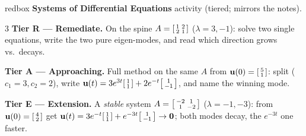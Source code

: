 \documentclass[10pt]{article}
\newcommand{\uu}{\mathbf{u}}
\newcommand{\zero}{\mathbf{0}}
\begin{document}
\begin{skillbox}{redbox}
\textbf{Systems of Differential Equations} activity (tiered; mirrors the notes).
\begin{multicols}{3}
\textbf{Tier R --- Remediate.} On the spine $A=\begin{bsmallmatrix}1&2\\2&1\end{bsmallmatrix}$ ($\lambda=3,-1$):
solve two single equations, write the two pure eigen-modes, and read which direction grows vs.\ decays.

\columnbreak
\textbf{Tier A --- Approaching.} Full method on the same $A$ from $\uu(0)=\begin{bsmallmatrix}5\\1\end{bsmallmatrix}$:
split ($c_1=3,c_2=2$), write $\uu(t)=3e^{3t}\begin{bsmallmatrix}1\\1\end{bsmallmatrix}+2e^{-t}\begin{bsmallmatrix}1\\-1\end{bsmallmatrix}$, and name the winning mode.

\columnbreak
\textbf{Tier E --- Extension.} A \emph{stable} system $A=\begin{bsmallmatrix}-2&1\\1&-2\end{bsmallmatrix}$
($\lambda=-1,-3$): from $\uu(0)=\begin{bsmallmatrix}4\\2\end{bsmallmatrix}$ get
$\uu(t)=3e^{-t}\begin{bsmallmatrix}1\\1\end{bsmallmatrix}+e^{-3t}\begin{bsmallmatrix}1\\-1\end{bsmallmatrix}\to\zero$; both modes decay, the $e^{-3t}$ one faster.
\end{multicols}
\end{skillbox}
\end{document}
